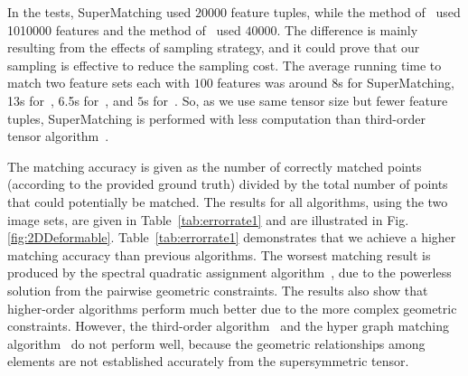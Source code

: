 In the tests, SuperMatching used $20000$ feature tuples, while the method of~\cite{Duchenne09} used 1010000 features  and the method of~\cite{Zass08} used $40000$.
The difference is mainly resulting from the effects of sampling strategy, and it could prove that our sampling is effective to reduce the sampling cost.
The average running time to match two feature sets each with $100$ features was around 8s for SuperMatching, 13s for~\cite{Duchenne09}, 6.5s for~\cite{Zass08}, and $5$s for~\cite{Cour06}.
So, as we use same tensor size but fewer feature tuples, SuperMatching is performed with less computation than third-order tensor algorithm~\cite{Duchenne09}.

The matching accuracy is given as the number of correctly matched points (according to the provided ground truth) divided by the total number of points that could potentially be matched.
The results for all algorithms, using the two image sets, are given in Table~\ref{tab:errorrate1} and are illustrated in Fig.\ref{fig:2DDeformable}.
Table~\ref{tab:errorrate1} demonstrates that we achieve a higher matching accuracy than previous algorithms.
The worsest matching result is produced by the spectral quadratic assignment algorithm~\cite{Cour06},
due to the powerless solution from the pairwise geometric constraints.
The results also show that higher-order algorithms perform much better due to the more complex geometric constraints.
However, the third-order algorithm~\cite{Duchenne09} and the hyper graph matching algorithm~\cite{Zass08} do not perform well,
because the geometric relationships among elements are not established accurately from the supersymmetric tensor.

